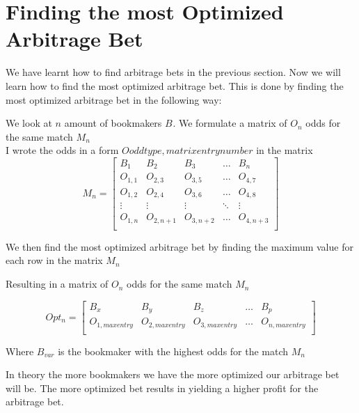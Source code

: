 
\section{Finding the most Optimized Arbitrage Bet}

We have learnt how to find arbitrage bets in the previous section. Now we will learn how to find the most optimized arbitrage bet. This is done by finding the most optimized arbitrage bet in the following way:

We look at $n$ amount of bookmakers $B_{}$. We formulate a matrix of $O_{n}$ odds for the same match $M_{n}$\\

I wrote the odds in a form $O{oddtype,matrixentrynumber}$ in the matrix\\

\begin{equation}
    M_{n} = \begin{bmatrix}
        B_{1} & B_{2} & B_{3} & \dots & B_{n} \\
        O_{1,1} & O_{2,3} & O_{3,5} & \dots & O_{4,7} \\
        O_{1,2} & O_{2,4} & O_{3,6} & \dots & O_{4,8} \\
        \vdots & \vdots & \vdots & \ddots & \vdots \\
        O_{1,n} & O_{2,n+1} & O_{3,n+2} & \dots & O_{4,n+3} \\
    \end{bmatrix}
\end{equation}

We then find the most optimized arbitrage bet by finding the maximum value for each row in the matrix $M_{n}$

Resulting in a matrix of $O_{n}$ odds for the same match $M_{n}$

\begin{equation}
    Opt_{n} = \begin{bmatrix}
        B_{x} & B_{y} & B_{z} & \dots & B_{p} \\
        O_{1,maxentry} & O_{2,maxentry} & O_{3,maxentry} & \dots & O_{n,maxentry} \\
    \end{bmatrix}
\end{equation}

Where $B_{var}$ is the bookmaker with the highest odds for the match $M_{n}$

In theory the more bookmakers we have the more optimized our arbitrage bet will be. The more optimized bet results in yielding a higher profit for the arbitrage bet.\\

